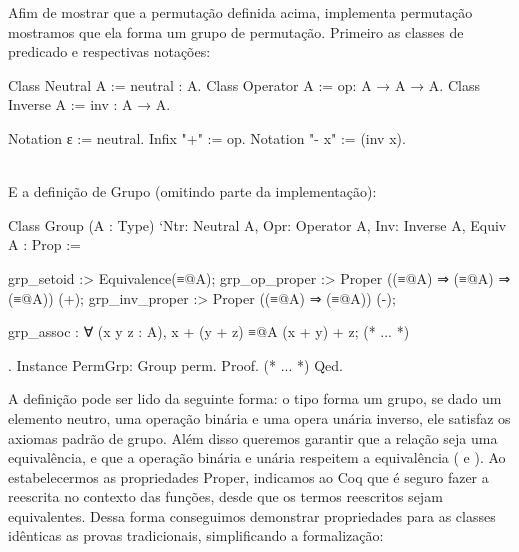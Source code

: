 Afim de mostrar que a permutação definida acima, implementa permutação mostramos que ela forma um grupo de permutação. Primeiro as classes de predicado e respectivas notações:
\vspace*{.4em}\\
\begin{minipage}[t]{0.5\linewidth}
\begin{coqcode}
Class Neutral A := neutral : A.
Class Operator A := op: A → A → A.
Class Inverse A := inv : A → A.
\end{coqcode}
\end{minipage}
\hspace{-1em}
\begin{minipage}[t]{0.5\linewidth}
\begin{coqcode}
Notation ɛ := neutral.
Infix "+" := op.
Notation "- x" := (inv x).
\end{coqcode}
\end{minipage}
\vspace*{1em}\\
E a definição de Grupo (omitindo parte da implementação):
\begin{coqcode}
Class Group (A : Type)
   `{Ntr: Neutral A, Opr: Operator A, Inv: Inverse A, Equiv A} : Prop := {
  grp_setoid :> Equivalence(≡@{A});
  grp_op_proper :> Proper ((≡@{A}) ⇒ (≡@{A}) ⇒ (≡@{A})) (+);
  grp_inv_proper :> Proper ((≡@{A}) ⇒ (≡@{A})) (-);

  grp_assoc : ∀ (x y z : A), x + (y + z) ≡@{A} (x + y) + z;
  (* ... *)
}.
Instance PermGrp: Group perm. Proof. (* ... *) Qed.
\end{coqcode}
A definição  pode ser lido da seguinte forma: o tipo  forma um grupo, se dado um elemento neutro, uma operação binária e uma opera unária inverso, ele satisfaz os axiomas padrão de grupo. Além disso queremos garantir que a relação seja uma equivalência, e que a operação binária e unária respeitem a equivalência ( e ). Ao estabelecermos as propriedades Proper, indicamos ao Coq que é seguro fazer a reescrita no contexto das funções, desde que os termos reescritos sejam equivalentes. Dessa forma conseguimos demonstrar propriedades para as classes idênticas as provas tradicionais, simplificando a formalização: 
\vspace*{.4em}\\
